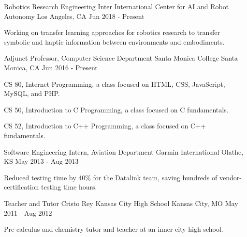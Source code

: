 


\begin{cventries}



\cventry
{Robotics Research Engineering Inter}
{International Center for AI and Robot Autonomy}
{Los Angeles, CA}
{Jun 2018 - Present}
{
\begin{cvitems}
\item Working on transfer learning approaches for robotics research to transfer symbolic and haptic information between environments and embodiments.
\end{cvitems}
}


\cventry
{Adjunct Professor, Computer Science Department}
{Santa Monica College}
{Santa Monica, CA}
{Jun 2016 - Present}
{
\begin{cvitems}
\item CS 80, Internet Programming, a class focused on HTML, CSS, JavaScript, MySQL, and PHP.
\item CS 50, Introduction to C Programming, a class focused on C fundamentals.
\item CS 52, Introduction to C++ Programming, a class focused on C++ fundamentals.
\end{cvitems}
}


\cventry
{Software Engineering Intern, Aviation Department}
{Garmin International}
{Olathe, KS}
{May 2013 - Aug 2013}
{
\begin{cvitems}
\item Reduced testing time by 40\% for the Datalink team, saving hundreds of vendor-certification testing time hours.
\end{cvitems}
}


\cventry
{Teacher and Tutor}
{Cristo Rey Kansas City High School}
{Kansas City, MO}
{May 2011 - Aug 2012}
{
\begin{cvitems}
\item Pre-calculus and chemistry tutor and teacher at an inner city high school.
\end{cvitems}
}

\end{cventries}